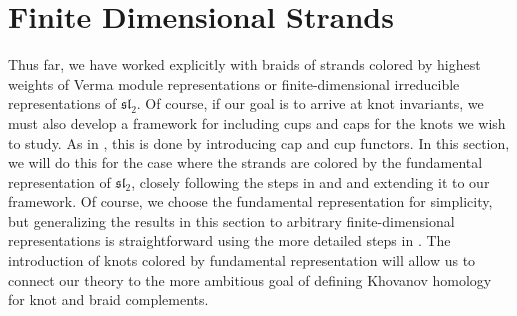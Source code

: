 \documentclass{article}
\begin{document}
    
\section{Finite Dimensional Strands}\label{sec:fund_strands}
Thus far, we have worked explicitly with braids of strands colored by highest weights of Verma module representations or finite-dimensional irreducible representations of $\mathfrak{sl_2}$. Of course, if our goal is to arrive at knot invariants, we must also develop a framework for including cups and caps for the knots we wish to study. As in \cite{Web}, this is done by introducing cap and cup functors. In this section, we will do this for the case where the strands are colored by the fundamental representation of $\mathfrak{sl_2}$, closely following the steps in \cite{Na2} and \cite{Web2} and extending it to our framework. Of course, we choose the fundamental representation for simplicity, but generalizing the results in this section to arbitrary finite-dimensional representations is straightforward using the more detailed steps in \cite{Web}. The introduction of knots colored by fundamental representation will allow us to connect our theory to the more ambitious goal of defining Khovanov homology for knot and braid complements. 
\end{document}

